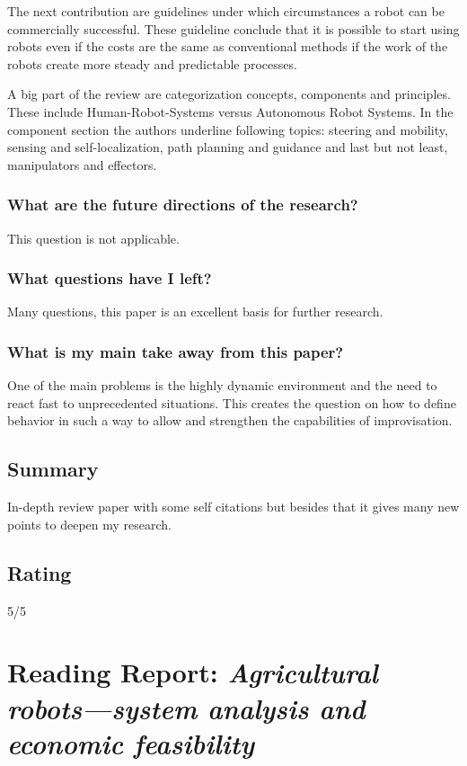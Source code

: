     The next contribution are guidelines under which circumstances a robot can be commercially successful. These guideline conclude
    that it is possible to start using robots even if the costs are the same as conventional methods if the work of
    the robots create more steady and predictable processes.
    
    A big part of the review are categorization concepts, components and principles. These include Human-Robot-Systems versus
    Autonomous Robot Systems. In the component section the authors underline following topics: steering and mobility, 
    sensing and self-localization, path planning and guidance and last but not least, manipulators and effectors.
    \subsubsection*{What are the future directions of the research?}
    This question is not applicable.
    \subsubsection*{What questions have I left?}
    Many questions, this paper is an excellent basis for further research.
    \subsubsection*{What is my main take away from this paper?}
    One of the main problems is the highly dynamic environment and the need to react fast to unprecedented situations.
    This creates the question on how to define behavior in such a way to allow and strengthen the capabilities of 
    improvisation.
    \subsection*{Summary}
    In-depth review paper with some self citations but besides that it gives many new points to deepen my research.
    
    \subsection*{Rating}
    5/5
    
    
    \newpage
    \section{Reading Report: \emph{Agricultural robots—system analysis and economic feasibility}}
    \cite{Pedersen2006}
    
